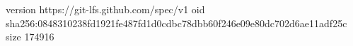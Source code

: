 version https://git-lfs.github.com/spec/v1
oid sha256:0848310238fd1921fe487fd1d0cdbc78dbb60f246e09e80dc702d6ae11adf25c
size 174916
